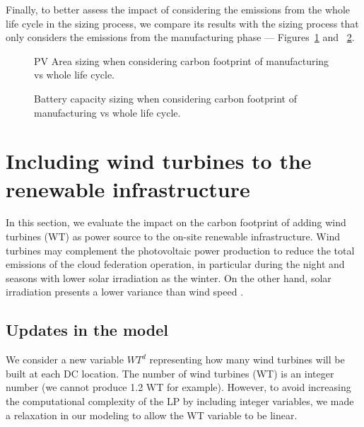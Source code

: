 Finally, to better assess the impact of considering the emissions from the whole life cycle in the sizing process, we compare its results with the sizing process that only considers the emissions from the manufacturing phase --- Figures~\ref{fig:pv_lca} and ~\ref{fig:bat_lca}.



\begin{figure}[H]
  \centering
  {}
  \caption{PV Area sizing when considering carbon footprint of manufacturing vs whole life cycle. }
  \label{fig:pv_lca}
\end{figure}


\begin{figure}[H]
  \centering
  {}
  \caption{Battery capacity sizing when considering carbon footprint of manufacturing vs whole life cycle.  }
  \label{fig:bat_lca}
\end{figure}



\section{Including wind turbines to the renewable infrastructure}
\label{sec:add_wt}


In this section, we evaluate the impact on the carbon footprint of adding wind turbines (WT) as power source to the on-site renewable infrastructure. Wind turbines may complement the photovoltaic power production to reduce the total emissions of the cloud federation operation, in particular during the night and seasons with lower solar irradiation as the winter. On the other hand, solar irradiation presents a lower variance than wind speed \cite{krakauer2017prediction_accuracy}.

\subsection{Updates in the model}
\label{sec:ex_model_wt}

We consider a new variable $WT^d$ representing how many wind turbines will be built at each DC location. The number of wind turbines (WT) is an integer number (we cannot produce 1.2 WT for example). However, to avoid increasing the computational complexity of the LP by including integer variables, we made a relaxation in our modeling to allow the WT variable to be linear. 

